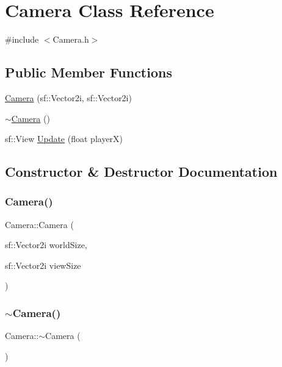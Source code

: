 \hypertarget{class_camera}{}\section{Camera Class Reference}
\label{class_camera}


{\ttfamily \#include $<$Camera.\+h$>$}

\subsection*{Public Member Functions}
\begin{DoxyCompactItemize}
\item 
\hyperlink{class_camera_ac66d9226b88695dcd665d9c089b18219}{Camera} (sf\+::\+Vector2i, sf\+::\+Vector2i)
\item 
\hyperlink{class_camera_ad1897942d0ccf91052386388a497349f}{$\sim$\+Camera} ()
\item 
sf\+::\+View \hyperlink{class_camera_a261c43250d32bcc95b26f092225a9d2f}{Update} (float playerX)
\end{DoxyCompactItemize}


\subsection{Constructor \& Destructor Documentation}
\hypertarget{class_camera_ac66d9226b88695dcd665d9c089b18219}{}\label{class_camera_ac66d9226b88695dcd665d9c089b18219} 
\subsubsection{\texorpdfstring{Camera()}{Camera()}}
{\footnotesize\ttfamily Camera\+::\+Camera (\begin{DoxyParamCaption}\item[{sf\+::\+Vector2i}]{world\+Size,  }\item[{sf\+::\+Vector2i}]{view\+Size }\end{DoxyParamCaption})}

\hypertarget{class_camera_ad1897942d0ccf91052386388a497349f}{}\label{class_camera_ad1897942d0ccf91052386388a497349f} 
\subsubsection{\texorpdfstring{$\sim$\+Camera()}{~Camera()}}
{\footnotesize\ttfamily Camera\+::$\sim$\+Camera (\begin{DoxyParamCaption}{ }\end{DoxyParamCaption})}



